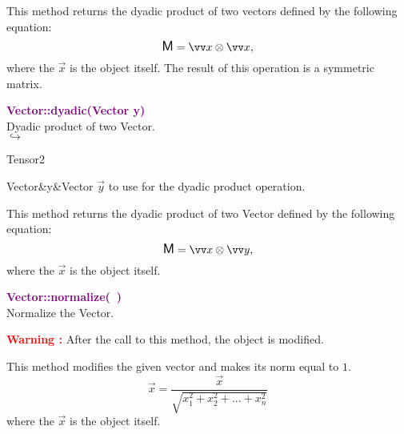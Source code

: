 This method returns the dyadic product of two vectors defined by the following equation:
\begin{equation*}
\M = \overrightarrow{x}\otimes\overrightarrow{x},
\end{equation*}
where the $\overrightarrow{x}$ is the object itself.
The result of this operation is a symmetric matrix.

\textcolor{purple}{\textbf{Vector::dyadic(Vector y)}}\label{Vector::dyadic(Vector y)}\\
Dyadic product of two Vector.\\ \hspace*{5mm}$\hookrightarrow$
\vspace*{-2em}\begin{tcolorbox}[grow to left by=-1cm, width=\textwidth-1cm,myArgs,tabularx={l|R}]
Tensor2
\end{tcolorbox}

\begin{tcolorbox}[width=\textwidth,myArgs,tabularx={ll|R}]
Vector&y&Vector $\overrightarrow{y}$ to use for the dyadic product operation.
\end{tcolorbox}

This method returns the dyadic product of two Vector defined by the following equation:
\begin{equation*}
\M = \overrightarrow{x}\otimes\overrightarrow{y},
\end{equation*}
where the $\overrightarrow{x}$ is the object itself.

\textcolor{purple}{\textbf{Vector::normalize(~)}}\label{Vector::normalize()}\\
Normalize the Vector.

\hspace*{10mm}\textcolor{red}{\textbf{Warning :}} After the call to this method, the object is modified.

This method modifies the given vector and makes its norm equal to $1$.
\begin{equation*}
\overrightarrow{x} = \frac{\overrightarrow{x}}{\sqrt {x_{1}^2 + x_{2}^2 + ... + x_{n}^2}}
\end{equation*}
where the $\overrightarrow{x}$ is the object itself.

